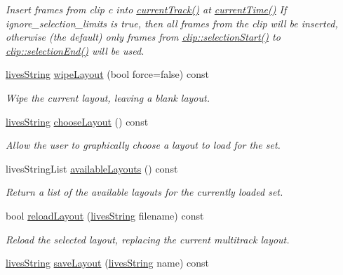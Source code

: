 \begin{DoxyCompactItemize}
\begin{DoxyCompactList}\small\item\em Insert frames from clip c into \hyperlink{classlives_1_1multitrack_afd651f56d20b98bf46d68ccfa25c50e8}{current\-Track()} at \hyperlink{classlives_1_1multitrack_a30f00aaa45426e7035cab06878481ccb}{current\-Time()} If ignore\-\_\-selection\-\_\-limits is true, then all frames from the clip will be inserted, otherwise (the default) only frames from \hyperlink{classlives_1_1clip_ae3bec5d06c36693307baab2f0ae2c591}{clip\-::selection\-Start()} to \hyperlink{classlives_1_1clip_a4e2b3c1a80795906f39f27390b8545ae}{clip\-::selection\-End()} will be used. \end{DoxyCompactList}\item 
\hyperlink{classlives_1_1livesString}{lives\-String} \hyperlink{classlives_1_1multitrack_ad885f138aa6c679aa12012c1b8c17eff}{wipe\-Layout} (bool force=false) const 
\begin{DoxyCompactList}\small\item\em Wipe the current layout, leaving a blank layout. \end{DoxyCompactList}\item 
\hyperlink{classlives_1_1livesString}{lives\-String} \hyperlink{classlives_1_1multitrack_a0cca1e969b0a453dd45a22cba913bcd4}{choose\-Layout} () const 
\begin{DoxyCompactList}\small\item\em Allow the user to graphically choose a layout to load for the set. \end{DoxyCompactList}\item 
lives\-String\-List \hyperlink{classlives_1_1multitrack_aa2211ef787da9b6e015489bfe1aaa6ef}{available\-Layouts} () const 
\begin{DoxyCompactList}\small\item\em Return a list of the available layouts for the currently loaded set. \end{DoxyCompactList}\item 
bool \hyperlink{classlives_1_1multitrack_a7b3e2b981aecdd9a76957cb48d2ec7e1}{reload\-Layout} (\hyperlink{classlives_1_1livesString}{lives\-String} filename) const 
\begin{DoxyCompactList}\small\item\em Reload the selected layout, replacing the current multitrack layout. \end{DoxyCompactList}\item 
\hyperlink{classlives_1_1livesString}{lives\-String} \hyperlink{classlives_1_1multitrack_a1317da7f96369c0c9dd31cac1096eaa7}{save\-Layout} (\hyperlink{classlives_1_1livesString}{lives\-String} name) const 

\end{DoxyCompactItemize}
